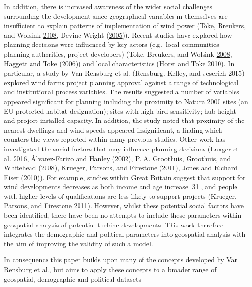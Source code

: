 \documentclass[a4paper,]{article}
\theoremstyle{definition}
\theoremstyle{definition}
\theoremstyle{remark}
\begin{document}
{In addition, there is increased awareness of the wider social challenges
surrounding the development since geographical variables in themselves
are insufficient to explain patterns of implementation of wind power
(Toke, Breukers, and Wolsink \protect\hyperlink{ref-Toke2008}{2008},
Devine-Wright (\protect\hyperlink{ref-Devine-Wright2005a}{2005})).
Recent studies have explored how planning decisions were influenced by
key actors (e.g.~local communities, planning authorities, project
developers) (Toke, Breukers, and Wolsink
\protect\hyperlink{ref-Toke2008}{2008}, Haggett and Toke
(\protect\hyperlink{ref-Haggett2006}{2006})) and local characteristics
(Horst and Toke \protect\hyperlink{ref-VanderHorst2010}{2010}). In
particular, a study by Van Rensburg et al. (Rensburg, Kelley, and
Jeserich \protect\hyperlink{ref-VanRensburg20}{2015}) explored wind
farms project planning approval against a range of technological and
institutional process variables. The results suggested a number of
variables appeared significant for planning including the proximity to
Natura 2000 sites (an EU protected habitat designation); sites with high
bird sensitivity; hub height and project installed capacity. In
addition, the study noted that proximity of the nearest dwellings and
wind speeds appeared insignificant, a finding which counters the views
reported within many previous studies. Other work has investigated the
social factors that may influence planning decisions (Langer et al.
\protect\hyperlink{ref-Langer2016a}{2016}, Álvarez-Farizo and Hanley
(\protect\hyperlink{ref-Alvarez-Farizo2002}{2002}), P. A. Groothuis,
Groothuis, and Whitehead (\protect\hyperlink{ref-Groothuis2008}{2008}),
Krueger, Parsons, and Firestone
(\protect\hyperlink{ref-Krueger2011}{2011}), Jones and Richard Eiser
(\protect\hyperlink{ref-Jones2010a}{2010})). For example, studies within
Great Britain suggest that support for wind developments decreases as
both income and age increase {[}31{]}, and people with higher levels of
qualifications are less likely to support projects (Krueger, Parsons,
and Firestone \protect\hyperlink{ref-Krueger2011}{2011}). However,
whilst these potential social factors have been identified, there have
been no attempts to include these parameters within geospatial analysis
of potential turbine developments. This work therefore integrates the
demographic and political parameters into geospatial analysis with the
aim of improving the validity of such a model.

In consequence this paper builds upon many of the concepts developed by
Van Rensburg et al., but aims to apply these concepts to a broader range
of geospatial, demographic and political datasets.

}
\end{document}
